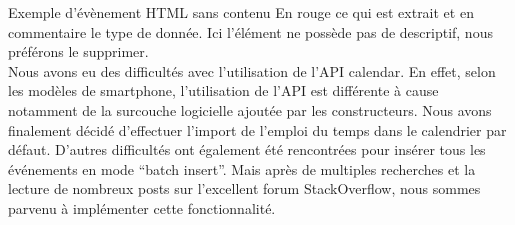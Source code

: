 %
%

Exemple d'évènement HTML sans contenu
En rouge ce qui est extrait et en commentaire le type de donnée. Ici l’élément ne possède pas de descriptif, nous préférons le supprimer. \\

Nous avons eu des difficultés avec l’utilisation de l’API calendar. En effet, selon les modèles de smartphone, l’utilisation de l’API est différente à cause notamment de la surcouche logicielle ajoutée par les constructeurs. Nous avons finalement décidé d’effectuer l’import de l’emploi du temps dans le calendrier par défaut. D’autres difficultés ont également été rencontrées pour insérer tous les événements en mode “batch insert”. Mais après de multiples recherches et la lecture de nombreux posts sur l’excellent forum StackOverflow, nous sommes parvenu à implémenter cette fonctionnalité.

